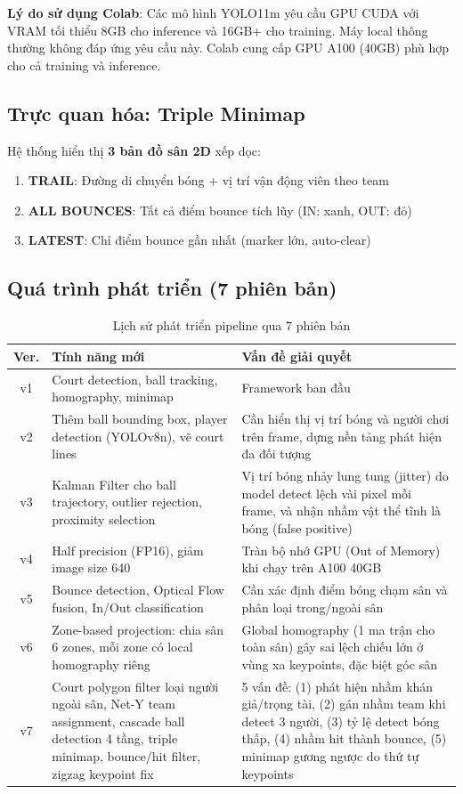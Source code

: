 \documentclass[12pt,a4paper]{article}
\begin{document}
\textbf{Lý do sử dụng Colab}: Các mô hình YOLO11m yêu cầu GPU CUDA với VRAM tối thiểu 8GB cho inference và 16GB+ cho training. Máy local thông thường không đáp ứng yêu cầu này. Colab cung cấp GPU A100 (40GB) phù hợp cho cả training và inference.

\subsection{Trực quan hóa: Triple Minimap}
Hệ thống hiển thị \textbf{3 bản đồ sân 2D} xếp dọc:
\begin{enumerate}[noitemsep]
    \item \textbf{TRAIL}: Đường di chuyển bóng + vị trí vận động viên theo team
    \item \textbf{ALL BOUNCES}: Tất cả điểm bounce tích lũy (IN: xanh, OUT: đỏ)
    \item \textbf{LATEST}: Chỉ điểm bounce gần nhất (marker lớn, auto-clear)
\end{enumerate}

\subsection{Quá trình phát triển (7 phiên bản)}

\begin{table}[H]
\centering
\caption{Lịch sử phát triển pipeline qua 7 phiên bản}
\label{tab:versions}
\begin{tabularx}{\textwidth}{c X X}
\toprule
\textbf{Ver.} & \textbf{Tính năng mới} & \textbf{Vấn đề giải quyết} \\
\midrule
v1 & Court detection, ball tracking, homography, minimap & Framework ban đầu \\
v2 & Thêm ball bounding box, player detection (YOLOv8n), vẽ court lines & Cần hiển thị vị trí bóng và người chơi trên frame, dựng nền tảng phát hiện đa đối tượng \\
v3 & Kalman Filter cho ball trajectory, outlier rejection, proximity selection & Vị trí bóng nhảy lung tung (jitter) do model detect lệch vài pixel mỗi frame, và nhận nhầm vật thể tĩnh là bóng (false positive) \\
v4 & Half precision (FP16), giảm image size 640 & Tràn bộ nhớ GPU (Out of Memory) khi chạy trên A100 40GB \\
v5 & Bounce detection, Optical Flow fusion, In/Out classification & Cần xác định điểm bóng chạm sân và phân loại trong/ngoài sân \\
v6 & Zone-based projection: chia sân 6 zones, mỗi zone có local homography riêng & Global homography (1 ma trận cho toàn sân) gây sai lệch chiếu lớn ở vùng xa keypoints, đặc biệt góc sân \\
v7 & Court polygon filter loại người ngoài sân, Net-Y team assignment, cascade ball detection 4 tầng, triple minimap, bounce/hit filter, zigzag keypoint fix & 5 vấn đề: (1) phát hiện nhầm khán giả/trọng tài, (2) gán nhầm team khi detect 3 người, (3) tỷ lệ detect bóng thấp, (4) nhầm hit thành bounce, (5) minimap gương ngược do thứ tự keypoints \\
\bottomrule
\end{tabularx}
\end{table}
\end{document}
